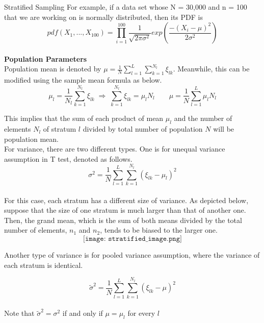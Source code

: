 \documentclass[12pt]{article}
\begin{document}
\begin{section}{Stratified Sampling}
For example, if a data set whose N = 30,000 and n = 100 that we are working on is normally distributed, then its PDF is 
$$pdf(X_1,...,X_{100}) = \prod_{i=1}^{100} \frac{1}{\sqrt{2\pi\sigma ^2}}exp(\frac{-(X_i-\mu)^2}{2\sigma ^2})$$\\

\textbf{Population Parameters}\\
Population mean is denoted by $\mu = \frac{1}{N} \sum\limits_{l=1}^{L} \sum\limits_{k=1}^{N_l} \xi_{lk}$. Meanwhile, this can be modified using the sample mean formula as below. 
$$\mu_l = \frac{1}{N_l} \sum\limits_{k=1}^{N_l} \xi_{lk} \; \Rightarrow \;\sum\limits_{k=1}^{N_l} \xi_{lk} = \mu_l N_l \qquad \mu = \frac{1}{N} \sum\limits_{l=1}^{L} \mu_l N_l$$ 

This implies that the sum of each product of mean $\mu_l$ and the number of elements $N_l$ of stratum $l$ divided by total number of population $N$ will be population mean.\\ 

For variance, there are two different types. One is for unequal variance assumption in T test, denoted as follows.\\
$$\sigma^2 = \frac{1}{N} \sum\limits_{l=1}^{L} \sum\limits_{k=1}^{N_l} (\xi_{lk}-\mu_l)^2$$\\
For this case, each stratum has a different size of variance. As depicted below, suppose that the size of one stratum is much larger than that of another one. Then, the grand mean, which is the sum of both means divided by the total number of elements, $n_1$ and $n_2$, tends to be biased to the larger one.\\

$$\texttt{[image: stratified\_image.png]}$$

Another type of variance is for pooled variance assumption, where the variance of each stratum is identical. 

$$\tilde{\sigma}^2 = \frac{1}{N} \sum\limits_{l=1}^{L} \sum\limits_{k=1}^{N_l} (\xi_{lk}-\mu)^2$$ \\
Note that $\tilde{\sigma}^2 = \sigma ^2$ if and only if $\mu = \mu_l$ for every $l$\\

\end{section}
\end{document}
